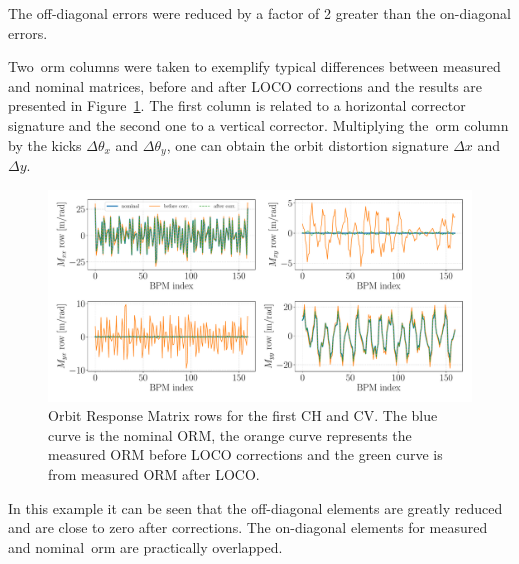 The off-diagonal errors were reduced by a factor of 2 greater than the on-diagonal errors.

Two~\gls{orm} columns were taken to exemplify typical differences between measured and nominal matrices, before and after LOCO corrections and the results are presented in Figure~\ref{fig:orm_rows}. The first column is related to a horizontal corrector signature and the second one to a vertical corrector. Multiplying the~\gls{orm} column by the kicks $\Delta\theta_x$ and $\Delta\theta_y$, one can obtain the orbit distortion signature $\Delta x$ and $\Delta y$.
\begin{figure}
\centering
\includegraphics[width=1.0\textwidth]{figures/nominal_measured_after_before_loco_big.pdf}
\caption{Orbit Response Matrix rows for the first CH and CV. The blue curve is the nominal ORM, the orange curve represents the measured ORM before LOCO corrections and the green curve is from measured ORM after LOCO.}
\label{fig:orm_rows}
\end{figure}

In this example it can be seen that the off-diagonal elements are greatly reduced and are close to zero after corrections. The on-diagonal elements for measured and nominal~\gls{orm} are practically overlapped.

